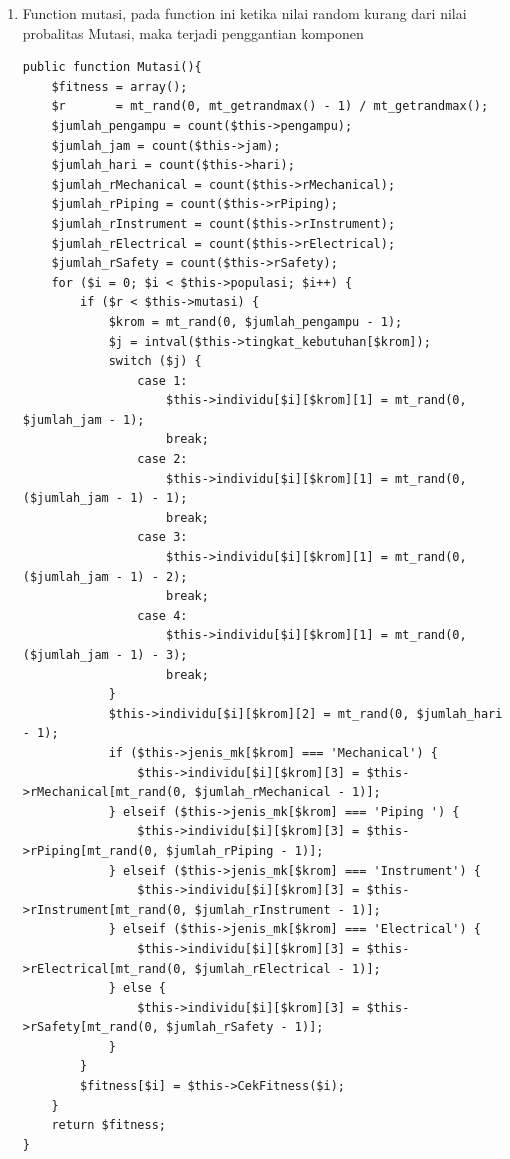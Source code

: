 \begin{enumerate}
	\item Function mutasi, pada function ini ketika nilai random kurang dari nilai probalitas Mutasi, maka terjadi penggantian komponen
\begin{lstlisting}
public function Mutasi(){
    $fitness = array();
    $r       = mt_rand(0, mt_getrandmax() - 1) / mt_getrandmax();
    $jumlah_pengampu = count($this->pengampu);
    $jumlah_jam = count($this->jam);
    $jumlah_hari = count($this->hari);
    $jumlah_rMechanical = count($this->rMechanical);
    $jumlah_rPiping = count($this->rPiping);
    $jumlah_rInstrument = count($this->rInstrument);
    $jumlah_rElectrical = count($this->rElectrical);
    $jumlah_rSafety = count($this->rSafety);
    for ($i = 0; $i < $this->populasi; $i++) {
        if ($r < $this->mutasi) {
            $krom = mt_rand(0, $jumlah_pengampu - 1);
            $j = intval($this->tingkat_kebutuhan[$krom]);
            switch ($j) {
                case 1:
                    $this->individu[$i][$krom][1] = mt_rand(0, $jumlah_jam - 1);
                    break;
                case 2:
                    $this->individu[$i][$krom][1] = mt_rand(0, ($jumlah_jam - 1) - 1);
                    break;
                case 3:
                    $this->individu[$i][$krom][1] = mt_rand(0, ($jumlah_jam - 1) - 2);
                    break;
                case 4:
                    $this->individu[$i][$krom][1] = mt_rand(0, ($jumlah_jam - 1) - 3);
                    break;
            }
            $this->individu[$i][$krom][2] = mt_rand(0, $jumlah_hari - 1);
            if ($this->jenis_mk[$krom] === 'Mechanical') {
                $this->individu[$i][$krom][3] = $this->rMechanical[mt_rand(0, $jumlah_rMechanical - 1)];
            } elseif ($this->jenis_mk[$krom] === 'Piping ') {
                $this->individu[$i][$krom][3] = $this->rPiping[mt_rand(0, $jumlah_rPiping - 1)];
            } elseif ($this->jenis_mk[$krom] === 'Instrument') {
                $this->individu[$i][$krom][3] = $this->rInstrument[mt_rand(0, $jumlah_rInstrument - 1)];
            } elseif ($this->jenis_mk[$krom] === 'Electrical') {
                $this->individu[$i][$krom][3] = $this->rElectrical[mt_rand(0, $jumlah_rElectrical - 1)];
            } else {
                $this->individu[$i][$krom][3] = $this->rSafety[mt_rand(0, $jumlah_rSafety - 1)];
            }
        }
        $fitness[$i] = $this->CekFitness($i);
    }
    return $fitness;
}
\end{lstlisting}
		

\end{enumerate}
